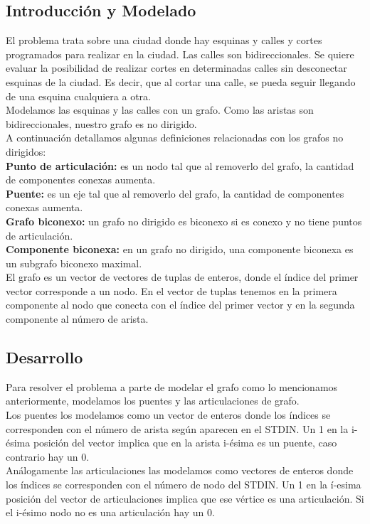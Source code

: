\documentclass[a4paper]{article}
\begin{document}
\subsection{Introducción y Modelado}

El problema trata sobre una ciudad donde hay esquinas y calles y cortes programados para realizar en la ciudad. Las calles son bidireccionales. Se quiere evaluar la posibilidad de realizar cortes en determinadas calles sin desconectar esquinas de la ciudad. Es decir, que al cortar una calle, se pueda seguir llegando de una esquina cualquiera a otra.\\

Modelamos las esquinas y las calles con un grafo. Como las aristas son bidireccionales, nuestro grafo es no dirigido.\\

A continuación detallamos algunas definiciones relacionadas con los grafos no dirigidos:\\

\textbf{Punto de articulación:} es un nodo tal que al removerlo del grafo, la cantidad de componentes conexas aumenta.\\

\textbf{Puente:} es un eje tal que al removerlo del grafo, la cantidad de componentes conexas aumenta.\\

\textbf{Grafo biconexo:} un grafo no dirigido es biconexo si es conexo y no tiene puntos de
articulación.\\

\textbf{Componente biconexa:} en un grafo no dirigido, una componente biconexa es un subgrafo
biconexo maximal.\\

 El grafo es un vector de vectores de tuplas de enteros, donde el índice del primer vector corresponde a un nodo. En el vector de tuplas tenemos en la primera componente al nodo que conecta con el índice del primer vector y en la segunda componente al número de arista.\\
 
 \newpage
 
 \subsection{Desarrollo}
 
Para resolver el problema a parte de modelar el grafo como lo mencionamos anteriormente, modelamos los puentes y las articulaciones de grafo.\\
Los puentes los modelamos como un vector de enteros donde los índices se corresponden con el número de arista según aparecen en el STDIN. Un 1 en la i-ésima posición del vector implica que en la arista i-ésima es un puente, caso contrario hay un 0.\\
Análogamente las articulaciones las modelamos como vectores de enteros donde los índices se corresponden con el número de nodo del STDIN. Un 1 en la í-esima posición del vector de articulaciones implica que ese vértice es una articulación. Si el i-ésimo nodo no es una articulación hay un 0.\\
\end{document}
